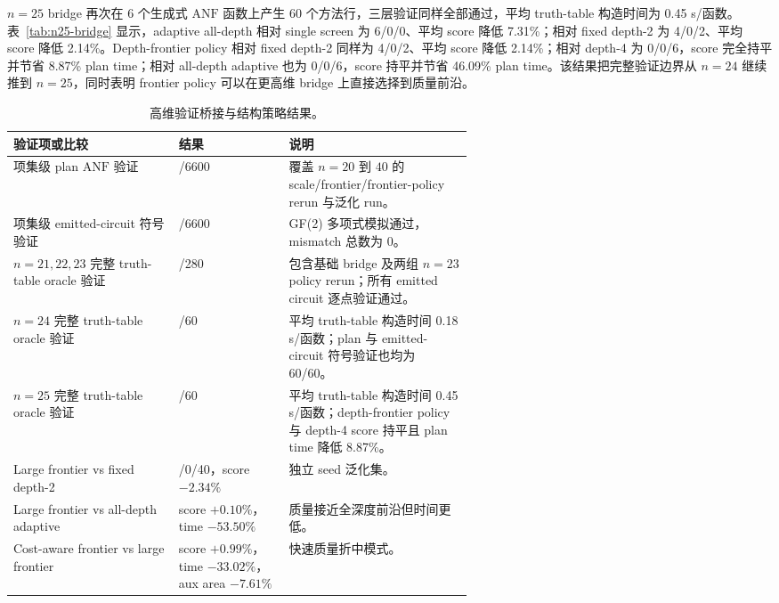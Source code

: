 \documentclass[UTF8,fontset=macnew,11pt]{ctexart}
\newcommand{\anf}{\ensuremath{\mathrm{ANF}}}
\newcommand{\ttable}{truth-table}
\begin{document}
$n=25$ bridge 再次在 6 个生成式 \anf{} 函数上产生 60 个方法行，三层验证同样全部通过，平均 truth-table 构造时间为 0.45 s/函数。表~\ref{tab:n25-bridge} 显示，adaptive all-depth 相对 single screen 为 6/0/0、平均 score 降低 7.31\%；相对 fixed depth-2 为 4/0/2、平均 score 降低 2.14\%。Depth-frontier policy 相对 fixed depth-2 同样为 4/0/2、平均 score 降低 2.14\%；相对 depth-4 为 0/0/6，score 完全持平并节省 8.87\% plan time；相对 all-depth adaptive 也为 0/0/6，score 持平并节省 46.09\% plan time。该结果把完整验证边界从 $n=24$ 继续推到 $n=25$，同时表明 frontier policy 可以在更高维 bridge 上直接选择到质量前沿。

\begin{table}[H]
\centering
\scriptsize
\caption{$n=24$ 完整 truth-table bridge 的资源比较。}
\label{tab:n24-bridge}

\end{table}

\begin{table}[H]
\centering
\scriptsize
\caption{$n=25$ 完整 truth-table bridge 的资源比较。}
\label{tab:n25-bridge}

\end{table}

\begin{table}[H]
\centering
\small
\caption{高维验证桥接与结构策略结果。}
\label{tab:highdim-validation}
\begin{tabularx}{\linewidth}{>{\raggedright\arraybackslash}p{0.36\linewidth}>{\raggedright\arraybackslash}p{0.24\linewidth}>{\raggedright\arraybackslash}X}
\toprule
验证项或比较 & 结果 & 说明 \\
\midrule
项集级 plan \anf{} 验证 & 6600/6600 & 覆盖 $n=20$ 到 $40$ 的 scale/frontier/frontier-policy rerun 与泛化 run。 \\
项集级 emitted-circuit 符号验证 & 6600/6600 & GF(2) 多项式模拟通过，mismatch 总数为 0。 \\
$n=21,22,23$ 完整 \ttable{} oracle 验证 & 280/280 & 包含基础 bridge 及两组 $n=23$ policy rerun；所有 emitted circuit 逐点验证通过。 \\
$n=24$ 完整 \ttable{} oracle 验证 & 60/60 & 平均 truth-table 构造时间 0.18 s/函数；plan 与 emitted-circuit 符号验证也均为 60/60。 \\
$n=25$ 完整 \ttable{} oracle 验证 & 60/60 & 平均 truth-table 构造时间 0.45 s/函数；depth-frontier policy 与 depth-4 score 持平且 plan time 降低 8.87\%。 \\
Large frontier vs fixed depth-2 & 56/0/40，score $-2.34\%$ & 独立 seed 泛化集。 \\
Large frontier vs all-depth adaptive & score $+0.10\%$，time $-53.50\%$ & 质量接近全深度前沿但时间更低。 \\
Cost-aware frontier vs large frontier & score $+0.99\%$，time $-33.02\%$，aux area $-7.61\%$ & 快速质量折中模式。 \\
\bottomrule
\end{tabularx}
\end{table}
\end{document}
